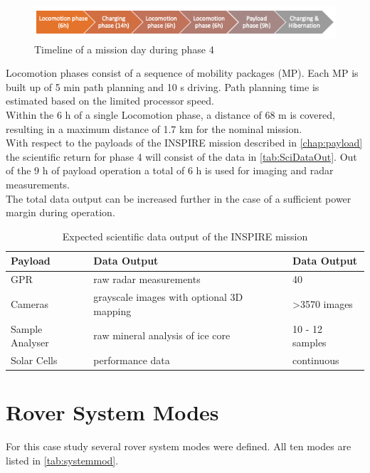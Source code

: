 \begin{figure}[htb]
  \includegraphics[width=1.0\textwidth]{Media/Timeline_day.png}
  \caption{Timeline of a mission day during phase 4}
  \label{fig:timeline-day}
\end{figure}


Locomotion phases consist of a sequence of mobility packages (MP). Each MP is built up of 5 min path planning and 10 s driving. Path planning time is estimated based on the limited processor speed. \\
Within the 6 h of a single Locomotion phase, a distance of 68 m is covered, resulting in a maximum distance of 1.7 km for the nominal mission.  \\

With respect to the payloads of the INSPIRE mission described in \autoref{chap:payload} the scientific return for phase 4 will consist of the data in \autoref{tab:SciDataOut}. Out of the 9 h of payload operation a total of 6 h is used for imaging and radar measurements. \\
The total data output can be increased further in the case of a sufficient power margin during operation.

\begin{table}[h]
\centering
\caption{Expected scientific data output of the INSPIRE mission }
\begin{tabular}{lll}
Payload         & Data Output                               & Data Output     \\ \hline\hline
GPR             & raw radar measurements                    & 40              \\
Cameras         & grayscale images with optional 3D mapping & >3570 images     \\
Sample Analyser & raw mineral analysis of ice core          & 10 - 12 samples \\
Solar Cells     & performance data                          & continuous      \\ \hline
\end{tabular}
\label{tab:SciDataOut}
\end{table}

  
\section{Rover System Modes}
\label{chap:rovsubmod}
For this case study several rover system modes were defined. All ten modes are listed in \autoref{tab:systemmod}. 

